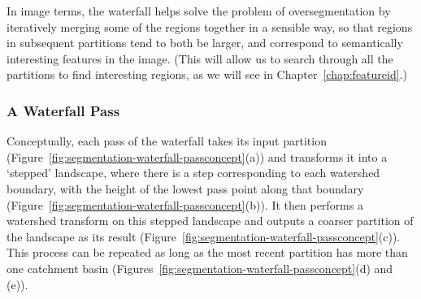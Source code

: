 In image terms, the waterfall helps solve the problem of oversegmentation by iteratively merging some of the regions together in a sensible way, so that regions in subsequent partitions tend to both be larger, and correspond to semantically interesting features in the image. (This will allow us to search through all the partitions to find interesting regions, as we will see in Chapter~\ref{chap:featureid}.)

\subsubsection{A Waterfall Pass}


Conceptually, each pass of the waterfall takes its input partition (Figure~\ref{fig:segmentation-waterfall-passconcept}(a)) and transforms it into a `stepped' landscape, where there is a step corresponding to each watershed boundary, with the height of the lowest pass point along that boundary (Figure~\ref{fig:segmentation-waterfall-passconcept}(b)). It then performs a watershed transform on this stepped landscape and outputs a coarser partition of the landscape as its result (Figure~\ref{fig:segmentation-waterfall-passconcept}(c)). This process can be repeated as long as the most recent partition has more than one catchment basin (Figures~\ref{fig:segmentation-waterfall-passconcept}(d) and (e)).

